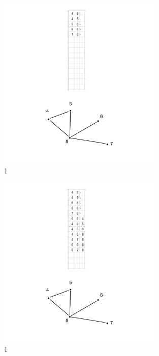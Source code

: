 \begin{frame}[t]
\begin{figure}[htbp] 
	\includegraphics[width=0.7\textwidth]{images/1.png}
	\caption{1}
	\label{fig:Bild1}
\end{figure}
\end{frame}


\begin{frame}[t]
\begin{figure}[htbp] 
	\includegraphics[width=0.7\textwidth]{images/2.png}
	\caption{1}
	\label{fig:Bild1}
\end{figure}
\end{frame}


